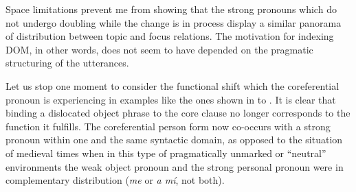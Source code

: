 \documentclass[output=paper]{LSP/langsci}
\begin{document}

Space limitations prevent me from showing that the strong pronouns which do not undergo doubling while the change is in process display a similar panorama of distribution between topic and focus relations. The motivation for indexing DOM, in other words, does not seem to have depended on the pragmatic structuring of the utterances. 

 Let us stop one moment to consider the functional shift which the coreferential pronoun is experiencing in examples like the ones shown in  to . It is clear that binding a dislocated object phrase to the core clause no longer corresponds to the function it fulfills. The coreferential person form now co-occurs with a strong pronoun within one and the same syntactic domain, as opposed to the situation of medieval times when in this type of pragmatically unmarked or “neutral” environments the weak object pronoun and the strong personal pronoun were in complementary distribution (\textit{me} or \textit{a mí}, not both). 
\end{document}
